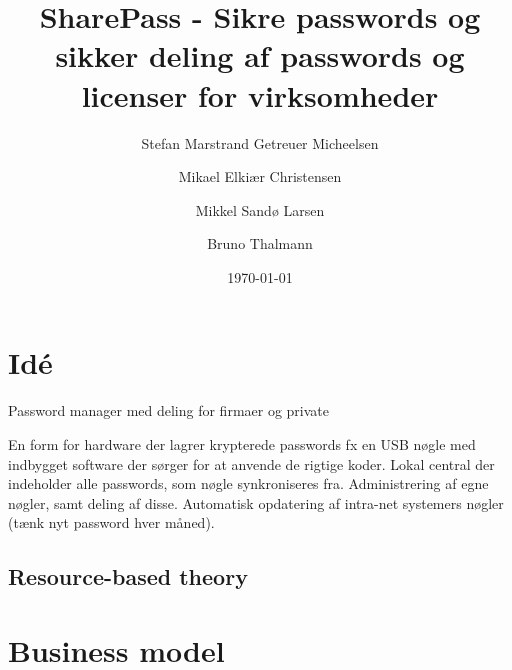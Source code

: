 \documentclass[a4paper]{article}
\title{SharePass - Sikre passwords og sikker deling af passwords og licenser for virksomheder}
\author{Stefan Marstrand Getreuer Micheelsen \and Mikael Elkiær Christensen \and Mikkel Sandø Larsen \and Bruno Thalmann}
\date{\today}
\begin{document}
\maketitle
\listoftodos


\section{Idé}
Password manager med deling for firmaer og private

En form for hardware der lagrer krypterede passwords fx en USB nøgle med indbygget software der sørger for at anvende de rigtige koder.
Lokal central der indeholder alle passwords, som nøgle synkroniseres fra.
Administrering af egne nøgler, samt deling af disse.
Automatisk opdatering af intra-net systemers nøgler (tænk nyt password hver måned).





\subsection{Resource-based theory}




\section{Business model}


\end{document}

